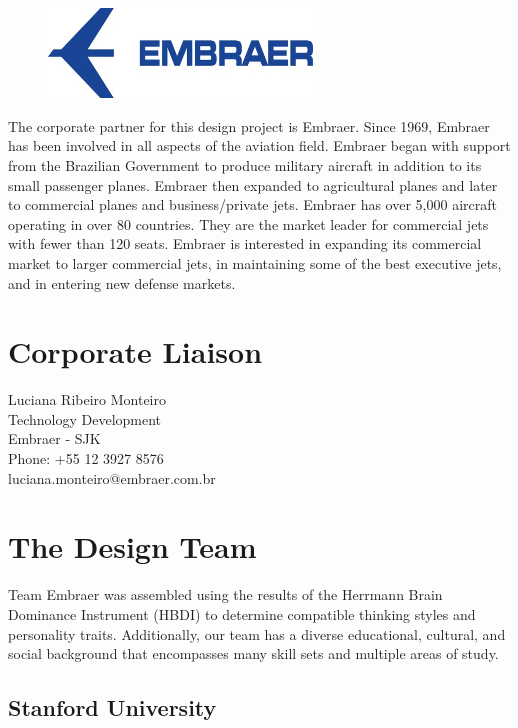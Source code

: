 \begin{figure}[h]
  \centering
     \includegraphics[width=7cm]{images/image010.jpg}
  \label{fig:10}
\end{figure}

The corporate partner for this design project is Embraer.  Since 1969, Embraer has been involved in all aspects of the aviation field.  Embraer began with support from the Brazilian Government to produce military aircraft in addition to its small passenger planes.  Embraer then expanded to agricultural planes and later to commercial planes and business/private jets.  Embraer has over 5,000 aircraft operating in over 80 countries.  They are the market leader for commercial jets with fewer than 120 seats.  Embraer is interested in expanding its commercial market to larger commercial jets, in maintaining some of the best executive jets, and in entering new defense markets.

\section*{Corporate Liaison}
Luciana Ribeiro Monteiro \\
  Technology Development \\
  Embraer - SJK \\
  Phone: +55 12 3927 8576 \\
  luciana.monteiro@embraer.com.br

\section{The Design Team}
Team Embraer was assembled using the results of the Herrmann Brain Dominance Instrument (HBDI) to determine compatible thinking styles and personality traits.  Additionally, our team has a diverse educational, cultural, and social background that encompasses many skill sets and multiple areas of study.

\subsection*{Stanford University}

